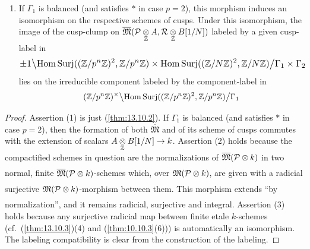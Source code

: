 \begin{kthm}
\begin{enumerate}[label=(\arabic*), leftmargin=2.4em]
\begin{center}
{}
\end{center}
which is radicial, surjective and integral.
\item If $\Gamma_1$ is balanced (and satisfies $*$ in case $p = 2$), this morphism induces an isomorphism on the respective schemes of cusps. Under this isomorphism, the image of the cusp-clump on $\overline{\mathfrak{M}}(\mathcal{P} \underset{\mathbb{Z}}{\otimes} A, \mathcal{R} \underset{\mathbb{Z}}{\otimes} B[1/N])$ labeled by a given cusp-label in
\[
\resizebox{\linewidth}{!}{$\displaystyle
\pm 1 \big\backslash \HomSurj((\Z/p^n\Z)^2, \Z/p^n\Z) \times \HomSurj((\Z/N\Z)^2, \Z/N\Z) \big/ \Gamma_1 \times \Gamma_2$}
\]
lies on the irreducible component labeled by the component-label in
\[
(\mathbb{Z}/p^n\mathbb{Z})^\times \big\backslash \mathrm{Hom\,Surj}((\mathbb{Z}/p^n\mathbb{Z})^2, \mathbb{Z}/p^n\mathbb{Z}) \big/ \Gamma_1
\]
\end{enumerate}
\end{kthm}

\begin{proof}
Assertion (1) is just (\ref{thm:13.10.2}). If $\Gamma_1$ is balanced (and satisfies $*$ in case $p = 2$), then the formation of both $\overline{\mathfrak{M}}$ and of its scheme of cusps commutes with the extension of scalars $A \underset{\mathbb{Z}}{\otimes} B[1/N] \to k$. Assertion (2) holds because the compactified schemes in question are the normalizations of $\overline{\mathfrak{M}}(\mathcal{P} \underset{}{\otimes} k)$ in two normal, finite $\overline{\mathfrak{M}}(\mathcal{P} \underset{}{\otimes} k)$-schemes which, over $\mathfrak{M}(\mathcal{P} \underset{}{\otimes} k)$, are given with a radicial surjective $\mathfrak{M}(\mathcal{P} \underset{}{\otimes} k)$-morphism between them. This morphism extends ``by normalization'', and it remains radicial, surjective and integral. Assertion (3) holds because any surjective radicial map between finite etale $k$-schemes (cf.\ (\ref{thm:13.10.3})(4) and (\ref{thm:10.10.3}(6))) is automatically an isomorphism. The labeling compatibility is clear from the construction of the labeling.
\end{proof}

